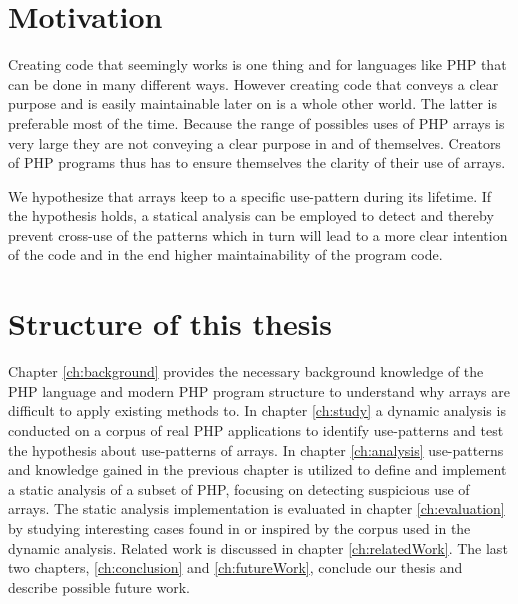 \section{Motivation}
Creating code that seemingly works is one thing and for languages like PHP that can be done in many different ways. However creating code that conveys a clear purpose and is easily maintainable later on is a whole other world. The latter is preferable most of the time. Because the range of possibles uses of PHP arrays is very large they are not conveying a clear purpose in and of themselves. Creators of PHP programs thus has to ensure themselves the clarity of their use of arrays. 

We hypothesize that arrays keep to a specific use-pattern during its lifetime. If the hypothesis holds, a statical analysis can be employed to detect and thereby prevent cross-use of the patterns which in turn will lead to a more clear intention of the code and in the end higher maintainability of the program code.

\section{Structure of this thesis}
Chapter \ref{ch:background} provides the necessary background knowledge of the PHP language and modern PHP program structure to understand why arrays are difficult to apply existing methods to. In chapter \ref{ch:study} a dynamic analysis is conducted on a corpus of real PHP applications to identify use-patterns and test the hypothesis about use-patterns of arrays. In chapter \ref{ch:analysis} use-patterns and knowledge gained in the previous chapter is utilized to define and implement a static analysis of a subset of PHP, focusing on detecting suspicious use of arrays. The static analysis implementation is evaluated in chapter \ref{ch:evaluation} by studying interesting cases found in or inspired by the corpus used in the dynamic analysis. Related work is discussed in chapter \ref{ch:relatedWork}. The last two chapters, \ref{ch:conclusion} and \ref{ch:futureWork}, conclude our thesis and describe possible future work.
